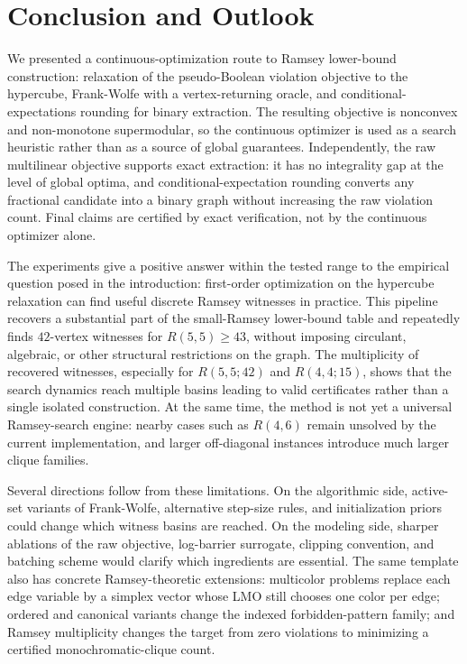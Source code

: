 \documentclass{article}
\begin{document}
\section{Conclusion and Outlook}

We presented a continuous-optimization route to Ramsey lower-bound construction: relaxation of the pseudo-Boolean violation objective to the hypercube, Frank-Wolfe with a vertex-returning oracle, and conditional-expectations rounding for binary extraction. The resulting objective is nonconvex and non-monotone supermodular, so the continuous optimizer is used as a search heuristic rather than as a source of global guarantees. Independently, the raw multilinear objective supports exact extraction: it has no integrality gap at the level of global optima, and conditional-expectation rounding converts any fractional candidate into a binary graph without increasing the raw violation count. Final claims are certified by exact verification, not by the continuous optimizer alone.

The experiments give a positive answer within the tested range to the empirical question posed in the introduction: first-order optimization on the hypercube relaxation can find useful discrete Ramsey witnesses in practice. This pipeline recovers a substantial part of the small-Ramsey lower-bound table and repeatedly finds $42$-vertex witnesses for $R(5,5) \geq 43$, without imposing circulant, algebraic, or other structural restrictions on the graph. The multiplicity of recovered witnesses, especially for $R(5,5;42)$ and $R(4,4;15)$, shows that the search dynamics reach multiple basins leading to valid certificates rather than a single isolated construction. At the same time, the method is not yet a universal Ramsey-search engine: nearby cases such as $R(4,6)$ remain unsolved by the current implementation, and larger off-diagonal instances introduce much larger clique families.

Several directions follow from these limitations. On the algorithmic side, active-set variants of Frank-Wolfe, alternative step-size rules, and initialization priors could change which witness basins are reached. On the modeling side, sharper ablations of the raw objective, log-barrier surrogate, clipping convention, and batching scheme would clarify which ingredients are essential. The same template also has concrete Ramsey-theoretic extensions: multicolor problems replace each edge variable by a simplex vector whose LMO still chooses one color per edge; ordered and canonical variants change the indexed forbidden-pattern family; and Ramsey multiplicity changes the target from zero violations to minimizing a certified monochromatic-clique count.
\end{document}
